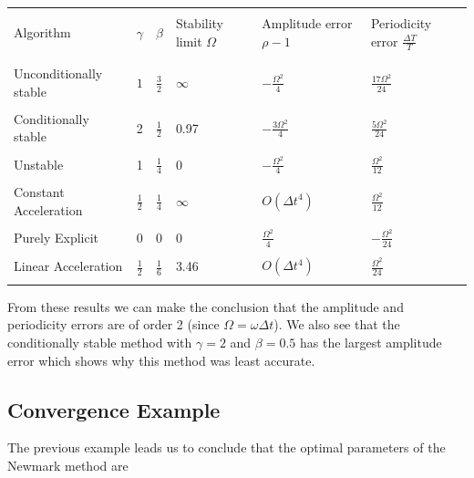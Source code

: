 \documentclass{article}
\begin{document}
				\begin{center}
   					 \begin{tabular}{| l | l | l | l | l | l |}
						\hline & & & & &\\
	Algorithm & $\gamma$ & $\beta$ & Stability limit $\Omega$ & Amplitude error $\rho -1$ & Periodicity error $\frac{\Delta T}{T}$
						\\ & & & & &
						\\ \hline & & & & &\\
	Unconditionally stable & $1$ & $\frac{3}{2}$ & $\infty$ & $-\frac{\Omega^2}{4}$ & $\frac{17\Omega^2}{24}$
						\\ & & & & &\\
	Conditionally stable & 2 & $\frac{1}{2}$ & 0.97 &$-\frac{3 \Omega^2}{4}$ &  $\frac{5 \Omega^2}{24}$ 
						\\ & & & & &\\
	Unstable & 1 & $\frac{1}{4}$ & 0 & $-\frac{\Omega^2}{4}$ & $\frac{\Omega^2}{12}$ 
						\\ & & & & &\\
	Constant Acceleration & $\frac{1}{2}$ & $\frac{1}{4}$ & $\infty$ & $O(\Delta t^4)$ & $\frac{\Omega^2}{12}$ 
						\\ & & & & &\\
	Purely Explicit & 0 & 0 & 0 & $\frac{\Omega^2}{4}$ & $-\frac{\Omega^2}{24}$
						\\ & & & & &\\
	Linear Acceleration & $\frac{1}{2}$ & $\frac{1}{6}$ & 3.46 & $O(\Delta t^4)$ & $\frac{\Omega^2}{24}$
						\\ & & & & &\\ \hline
    					\end{tabular}
				\end{center}
From these results we can make the conclusion that the amplitude and periodicity errors are of order 2 (since $\Omega = \omega \Delta t$). We also see that the conditionally stable method with $\gamma = 2$ and $\beta = 0.5$ has the largest amplitude error which shows why this method was least accurate. 


	\subsection{Convergence Example}
The previous example leads us to conclude that the optimal parameters of the Newmark method are 
\end{document}
